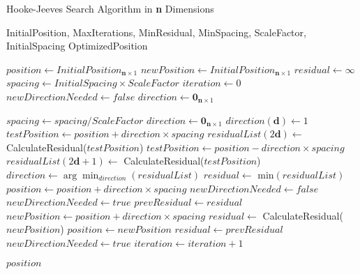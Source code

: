 \documentclass[12pt,a4paper]{report}
\begin{document}
\begin{algorithm}
	\caption{Hooke-Jeeves Search Algorithm in \textbf{n} Dimensions} \label{alg:hooke-jeeves-3d}
	\begin{algorithmic}[1]
		\Require InitialPosition, MaxIterations, MinResidual, MinSpacing, ScaleFactor, InitialSpacing
		\Ensure OptimizedPosition
		
		\State $position \gets InitialPosition_{\mathbf{n} \times 1}$
		\State $newPosition \gets InitialPosition_{\mathbf{n} \times 1}$
		\State $residual \gets \infty$
		\State $spacing \gets InitialSpacing \times ScaleFactor$
		\State $iteration \gets 0$
		\State $newDirectionNeeded \gets false$
		\State $direction \gets \mathbf{0}_{\mathbf{n} \times 1}$
		
		\State $spacing \gets spacing / ScaleFactor$
		\State $direction \gets \mathbf{0}_{\mathbf{n} \times 1}$
		\State $direction(\mathbf{d}) \gets 1$
		\State $testPosition \gets position + direction \times spacing$
		\State $residualList(2\mathbf{d}) \gets$ CalculateResidual($testPosition$)
		\State $testPosition \gets position - direction \times spacing$
		\State $residualList(2\mathbf{d}+1) \gets$ CalculateResidual($testPosition$)
		\EndFor
		\State $direction \gets \arg\!\min_{direction}(residualList)$
		\State $residual \gets$ min$(residualList)$
		\State $position \gets position + direction \times spacing$
		\State $newDirectionNeeded \gets false$
		\Else
		\State $newDirectionNeeded \gets true$
		\EndIf
		\Else
		\State $prevResidual \gets residual$
		\State $newPosition \gets position + direction \times spacing$
		\State $residual \gets$ CalculateResidual($newPosition$)
		\State $position \gets newPosition$
		\Else
		\State $residual \gets prevResidual$
		\State $newDirectionNeeded \gets true$
		\EndIf
		\EndIf
		\State $iteration \gets iteration + 1$
		\EndWhile
		
		\Return $position$
	\end{algorithmic}
\end{algorithm}



	
\end{document}
